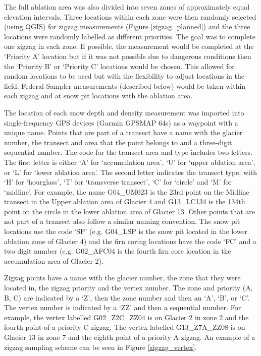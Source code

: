 \documentclass{sfuthesis}
\begin{document}
The full ablation area was also divided into seven zones of approximately equal elevation intervals. Three locations within each zone were then randomly selected (using QGIS) for zigzag \citep{Shea2010} measurements (Figure \ref{zigzag_planned}) and the three locations were randomly labelled as different priorities. The goal was to complete one zigzag in each zone. If possible, the measurement would be completed at the `Priority A' location but if it was not possible due to dangerous conditions then the `Priority B' or `Priority C' locations would be chosen. This allowed for random locations to be used but with the flexibility to adjust locations in the field. Federal Sampler measurements (described below) would be taken within each zigzag and at snow pit locations with the ablation area.  

The location of each snow depth and density measurement was imported into single-frequency GPS devices (Garmin GPSMAP 64s) as a waypoint with a unique name. Points that are part of a transect have a name with the glacier number, the transect and area that the point belongs to and a three-digit sequential number. The code for the transect area and type includes two letters. The first letter is either `A' for `accumulation area', `U' for `upper ablation area', or `L' for `lower ablation area'. The second letter indicates the transect type, with `H' for `hourglass', `T' for `transverse transect', `C' for `circle' and `M' for `midline'. For example, the name G04\_UM023 is the 23rd point on the Midline transect in the Upper ablation area of Glacier 4 and G13\_LC134 is the 134th point on the circle in the lower ablation area of Glacier 13. Other points that are not part of a transect also follow a similar naming convention. The snow pit locations use the code `SP' (e.g. G04\_LSP is the snow pit located in the lower ablation zone of Glacier 4) and the firn coring locations have the code `FC' and a two digit number (e.g. G02\_AFC04 is the fourth firn core location in the accumulation area of Glacier 2).

Zigzag points have a name with the glacier number, the zone that they were located in, the zigzag priority and the vertex number. The zone and priority (A, B, C) are indicated by a `Z', then the zone number and then an `A', `B', or `C'. The vertex number is indicated by a `ZZ' and then a sequential number. For example, the vertex labelled G02\_Z2C\_ZZ04 is on Glacier 2 in zone 2 and the fourth point of a priority C zigzag. The vertex labelled G13\_Z7A\_ZZ08 is on Glacier 13 in zone 7 and the eighth point of a priority A zigzag. An example of a zigzag sampling scheme can be seen in Figure \ref{zigzag_vertex}.
\end{document}
